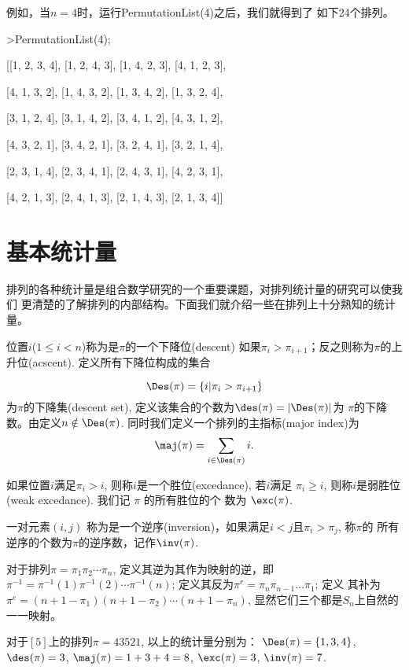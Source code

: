 例如，当$n=4$时，运行PermutationList(4)之后，我们就得到了
如下24个排列。

>PermutationList(4);

  [[1, 2, 3, 4], [1, 2, 4, 3], [1, 4, 2, 3], [4, 1, 2, 3],

        [4, 1, 3, 2], [1, 4, 3, 2], [1, 3, 4, 2], [1, 3, 2, 4],

        [3, 1, 2, 4], [3, 1, 4, 2], [3, 4, 1, 2], [4, 3, 1, 2],

        [4, 3, 2, 1], [3, 4, 2, 1], [3, 2, 4, 1], [3, 2, 1, 4],

        [2, 3, 1, 4], [2, 3, 4, 1], [2, 4, 3, 1], [4, 2, 3, 1],

        [4, 2, 1, 3], [2, 4, 1, 3], [2, 1, 4, 3], [2, 1, 3, 4]]

\section{基本统计量}%

排列的各种统计量是组合数学研究的一个重要课题，对排列统计量的研究可以使我们
更清楚的了解排列的内部结构。下面我们就介绍一些在排列上十分熟知的统计量。

位置$i$($1\leqslant i<n$)称为是$\pi$的一个{下降位}(descent)
如果$\pi_i>\pi_{i+1}$；反之则称为$\pi$的{上升位}(acscent).
定义所有下降位构成的集合

$$\Des(\pi)=\{i|\pi_i>\pi_{i+1}\}$$
为$\pi$的下降集(descent set),
定义该集合的个数为$\des(\pi)=|\Des(\pi)|$为
$\pi$的下降数。由定义$n\notin \Des(\pi)$.
同时我们定义一个排列的主指标(major index)为
\[\maj(\pi)=\sum \limits_{i \in \Des(\pi)}i.\]

如果位置$i$满足$\pi_i>i$, 则称$i$是一个{胜位}(excedance), 若$i$满足
$\pi_i\geq i$, 则称$i$是{弱胜位}(weak excedance). 我们记 $\pi$
的所有胜位的个 数为 $\exc(\pi)$.

一对元素$(i,j)$
称为是一个{逆序}(inversion)，如果满足$i<j$且$\pi_i>\pi_j$, 称$\pi$的
所有逆序的个数为$\pi$的逆序数，记作$\inv(\pi)$.

对于排列$\pi=\pi_1\pi_2\cdots \pi_n$, 定义其逆为其作为映射的逆，即
$\pi^{-1}=\pi^{-1}(1)\pi^{-1}(2)\cdots \pi^{-1}(n)$;
定义其反为$\pi^r=\pi_n\pi_{n-1}\ldots\pi_1$; 定义
其补为$\pi^c=(n+1-\pi_1)(n+1-\pi_2)\cdots(n+1-\pi_n)$,
显然它们三个都是$S_n$上自然的一一映射。

\begin{exa}
对于$[5]$上的排列$\pi=43521$, 以上的统计量分别为：
$\Des(\pi)=\{1,3,4\}$, $\des(\pi)=3$, $\maj(\pi)=1+3+4=8$,
$\exc(\pi)=3$, $\inv(\pi)=7$.
\end{exa}

